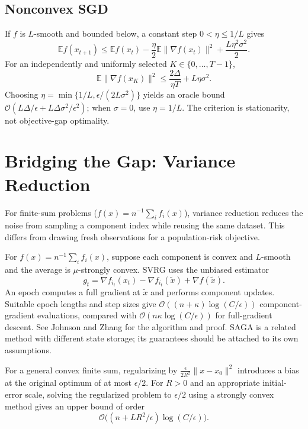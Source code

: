\documentclass[11pt]{article}
\begin{document}
\subsection{Nonconvex SGD}
If $f$ is $L$-smooth and bounded below, a constant step $0<\eta\le1/L$ gives
\[
\mathbb E f(x_{t+1})\le\mathbb E f(x_t)
-\frac\eta2\mathbb E\|\nabla f(x_t)\|^2+\frac{L\eta^2\sigma^2}{2}.
\]
For an independently and uniformly selected $K\in\{0,\ldots,T-1\}$,
\[
\mathbb E\|\nabla f(x_K)\|^2\le\frac{2\Delta}{\eta T}+L\eta\sigma^2.
\]
Choosing $\eta=\min\{1/L,\epsilon/(2L\sigma^2)\}$ yields an oracle bound
$\mathcal O(L\Delta/\epsilon+L\Delta\sigma^2/\epsilon^2)$; when $\sigma=0$, use $\eta=1/L$. The criterion is stationarity, not objective-gap optimality.

\section{Bridging the Gap: Variance Reduction}

For finite-sum problems ($f(x)=n^{-1}\sum_i f_i(x)$), variance reduction reduces the noise from sampling a component index while reusing the same dataset. This differs from drawing fresh observations for a population-risk objective.

\begin{remark}[title={SVRG: assumptions and cost}]
For $f(x)=n^{-1}\sum_i f_i(x)$, suppose each component is convex and $L$-smooth and the average is $\mu$-strongly convex. SVRG uses the unbiased estimator
\[
g_t=\nabla f_{i_t}(x_t)-\nabla f_{i_t}(\widetilde x)+\nabla f(\widetilde x).
\]
An epoch computes a full gradient at $\widetilde x$ and performs component updates. Suitable epoch lengths and step sizes give
$\mathcal O((n+\kappa)\log(C/\epsilon))$ component-gradient evaluations, compared with $\mathcal O(n\kappa\log(C/\epsilon))$ for full-gradient descent. See Johnson and Zhang for the algorithm and proof. SAGA is a related method with different state storage; its guarantees should be attached to its own assumptions.
\end{remark}

For a general convex finite sum, regularizing by $\frac{\epsilon}{2R^2}\|x-x_0\|^2$ introduces a bias at the original optimum of at most $\epsilon/2$. For $R>0$ and an appropriate initial-error scale, solving the regularized problem to $\epsilon/2$ using a strongly convex method gives an upper bound of order
\[
\mathcal O\big((n+LR^2/\epsilon)\log(C/\epsilon)\big).
\]
\end{document}
